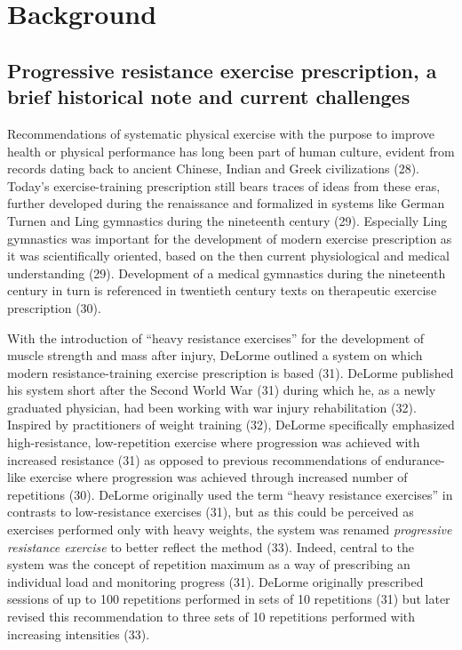 \documentclass[twoside,10pt]{gihclass} %
\begin{document}
\hypertarget{background}{%
\chapter{Background}\label{background}}

\hypertarget{progressive-resistance-exercise-prescription-a-brief-historical-note-and-current-challenges}{%
\section{Progressive resistance exercise prescription, a brief historical note and current challenges}\label{progressive-resistance-exercise-prescription-a-brief-historical-note-and-current-challenges}}

Recommendations of systematic physical exercise with the purpose to improve health or physical performance has long been part of human culture, evident from records dating back to ancient Chinese, Indian and Greek civilizations
(28).
Today's exercise-training prescription still bears traces of ideas from these eras, further developed during the renaissance and formalized in systems like German Turnen and Ling gymnastics during the nineteenth century
(29).
Especially Ling gymnastics was important for the development of modern exercise prescription as it was scientifically oriented, based on the then current physiological and medical understanding (29).
Development of a medical gymnastics during the nineteenth century in turn is referenced in twentieth century texts on therapeutic exercise prescription
(30).

With the introduction of ``heavy resistance exercises'' for the development of muscle strength and mass after injury, DeLorme outlined a system on which modern resistance-training exercise prescription is based (31).
DeLorme published his system short after the Second World War (31)
during which he, as a newly graduated physician, had been working with war injury rehabilitation
(32).
Inspired by practitioners of weight training (32),
DeLorme specifically emphasized high-resistance, low-repetition exercise where progression was achieved with increased resistance (31) as opposed to previous recommendations of endurance-like exercise where progression was achieved through increased number of repetitions
(30).
DeLorme originally used the term ``heavy resistance exercises'' in contrasts to low-resistance exercises (31), but as this could be perceived as exercises performed only with heavy weights, the system was renamed \emph{progressive resistance exercise} to better reflect the method
(33).
Indeed, central to the system was the concept of repetition maximum as a way of prescribing an individual load and monitoring progress (31).
DeLorme originally prescribed sessions of up to 100 repetitions performed in sets of 10 repetitions (31) but later revised this recommendation to three sets of 10 repetitions performed with increasing intensities
(33).
\end{document}
